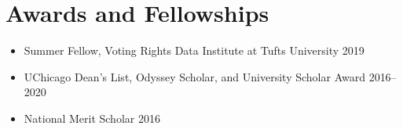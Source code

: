 
\section*{Awards and Fellowships}
\begin{itemize}

\item Summer Fellow, Voting Rights Data Institute at Tufts University \hfill 2019

\item UChicago Dean's List, Odyssey Scholar, and University Scholar Award \hfill 2016--2020

\item National Merit Scholar \hfill 2016

\end{itemize}

